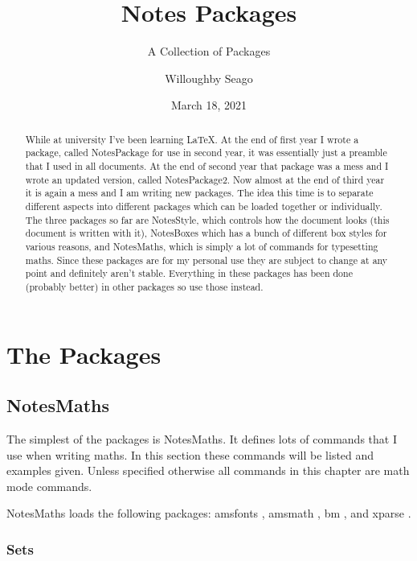 \documentclass[fleqn, a4paper, openany]{memoir}
\title{Notes Packages}
\author{Willoughby Seago}
\date{March 18, 2021}
\subtitle{A Collection of Packages}
\newcommand{\package}[1]{{\textsf{\footnotesize #1}}}  %
\begin{document}
    \frontmatter
    \titlepage
    \maketitle
    \begin{abstract}
        While at university I've been learning \LaTeX.
        At the end of first year I wrote a package, called \package{NotesPackage} for use in second year, it was essentially just a preamble that I used in all documents.
        At the end of second year that package was a mess and I wrote an updated version, called \package{NotesPackage2}.
        Now almost at the end of third year it is again a mess and I am writing new packages.
        The idea this time is to separate different aspects into different packages which can be loaded together or individually.
        The three packages so far are \package{NotesStyle}, which controls how the document looks (this document is written with it), \package{NotesBoxes} which has a bunch of different box styles for various reasons, and \package{NotesMaths}, which is simply a lot of commands for typesetting maths.
        Since these packages are for my personal use they are subject to change at any point and definitely aren't stable.
        Everything in these packages has been done (probably better) in other packages so use those instead.
    \end{abstract}
    \tableofcontents
    \mainmatter
    \part{The Packages}
    \chapter{NotesMaths}
    The simplest of the packages is \package{NotesMaths}.
    It defines lots of commands that I use when writing maths.
    In this section these commands will be listed and examples given.
    Unless specified otherwise all commands in this chapter are math mode commands.

    \package{NotesMaths} loads the following packages: \package{amsfonts} \cite{amsfonts}, \package{amsmath} \cite{amsmath}, \package{bm} \cite{bm}, and \package{xparse} \cite{xparse}.
    
    
    \section{Sets}
\end{document}
